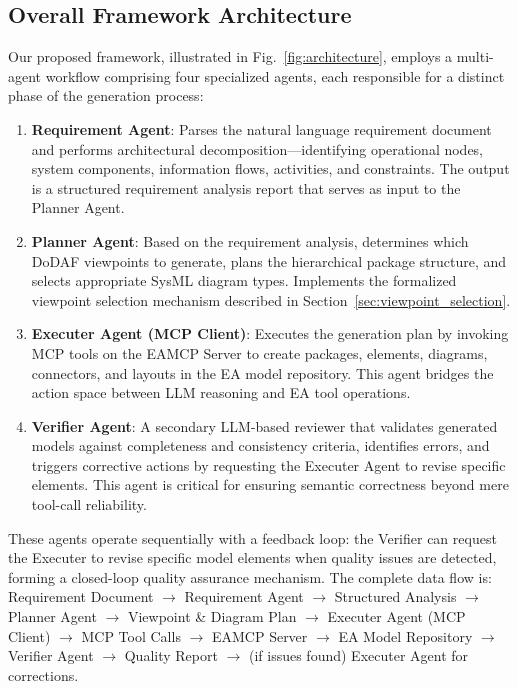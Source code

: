 \documentclass{ieeeaccess}
\begin{document}
\subsection{Overall Framework Architecture}

Our proposed framework, illustrated in Fig.~\ref{fig:architecture}, employs a multi-agent workflow comprising four specialized agents, each responsible for a distinct phase of the generation process:

\begin{enumerate}
    \item \textbf{Requirement Agent}: Parses the natural language requirement document and performs architectural decomposition---identifying operational nodes, system components, information flows, activities, and constraints. The output is a structured requirement analysis report that serves as input to the Planner Agent.
    \item \textbf{Planner Agent}: Based on the requirement analysis, determines which DoDAF viewpoints to generate, plans the hierarchical package structure, and selects appropriate SysML diagram types. Implements the formalized viewpoint selection mechanism described in Section~\ref{sec:viewpoint_selection}.
    \item \textbf{Executer Agent (MCP Client)}: Executes the generation plan by invoking MCP tools on the EAMCP Server to create packages, elements, diagrams, connectors, and layouts in the EA model repository. This agent bridges the action space between LLM reasoning and EA tool operations.
    \item \textbf{Verifier Agent}: A secondary LLM-based reviewer that validates generated models against completeness and consistency criteria, identifies errors, and triggers corrective actions by requesting the Executer Agent to revise specific elements. This agent is critical for ensuring semantic correctness beyond mere tool-call reliability.
\end{enumerate}

These agents operate sequentially with a feedback loop: the Verifier can request the Executer to revise specific model elements when quality issues are detected, forming a closed-loop quality assurance mechanism. The complete data flow is: Requirement Document $\rightarrow$ Requirement Agent $\rightarrow$ Structured Analysis $\rightarrow$ Planner Agent $\rightarrow$ Viewpoint \& Diagram Plan $\rightarrow$ Executer Agent (MCP Client) $\rightarrow$ MCP Tool Calls $\rightarrow$ EAMCP Server $\rightarrow$ EA Model Repository $\rightarrow$ Verifier Agent $\rightarrow$ Quality Report $\rightarrow$ (if issues found) Executer Agent for corrections.
\end{document}
